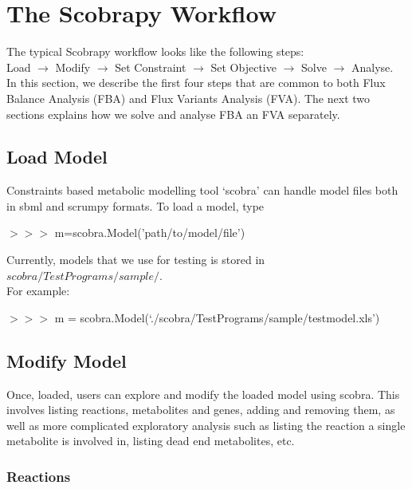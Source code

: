\chapter{The Scobrapy Workflow}

The typical Scobrapy workflow looks like the following steps: \\ 
Load $\rightarrow$ Modify $\rightarrow$ Set Constraint $\rightarrow$ Set Objective $\rightarrow$ Solve $\rightarrow$ Analyse. \\ 

In this section, we describe the first four steps that are common to both Flux Balance Analysis (FBA) and Flux Variants Analysis (FVA). The next two sections explains how we solve and analyse FBA an FVA separately. 

\section{Load Model}
Constraints based metabolic modelling tool `scobra' can handle model files both in sbml and scrumpy formats. To load a model, type

\begin{framed}
$>>>$ m=scobra.Model('path/to/model/file')
\end{framed}

Currently, models that we use for testing is stored in $scobra/TestPrograms/sample/$. \\

For example:

\begin{framed}
$>>>$ m = scobra.Model(`./scobra/TestPrograms/sample/testmodel.xls') 
\end{framed}

\section{Modify Model}
Once, loaded, users can explore and modify the loaded model using scobra. This involves listing reactions, metabolites and genes, adding and removing them, as well as more complicated exploratory analysis such as listing the reaction a single metabolite is involved in, listing dead end metabolites, etc. 

\subsection{Reactions}
